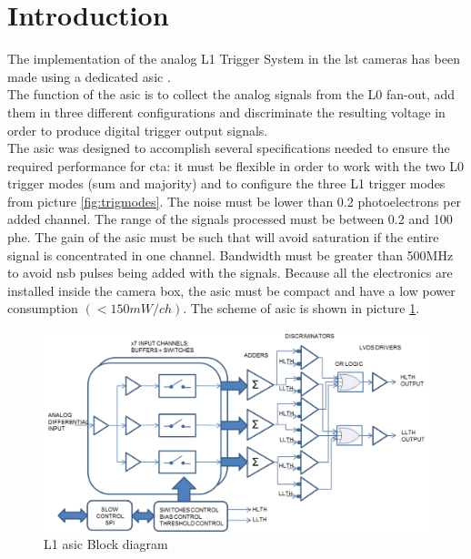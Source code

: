 \documentclass[main.tex]{subfiles}
\begin{document}
\glsresetall

\section{Introduction}

The implementation of the analog L1 Trigger System in the \gls{lst} cameras has been made using a dedicated \gls{asic} \cite{2014ASIC}.\\
The function of the \gls{asic} is to collect the analog signals from the L0 fan-out, add them in three different configurations and discriminate the resulting voltage in order to produce digital trigger output signals.\\
The \gls{asic} was designed to accomplish several specifications needed to ensure the required performance for \gls{cta}: it must be flexible in order to work with the two L0 trigger modes (sum and majority) and to configure the three L1 trigger modes from picture \ref{fig:trigmodes}. The noise must be lower than 0.2 photoelectrons per added channel. The range of the signals processed must be between 0.2 and 100 phe. The gain of the \gls{asic} must be
such that will avoid saturation if the entire signal is concentrated in one channel. Bandwidth must be greater than 500MHz to avoid \gls{nsb} pulses being added with the signals. Because all the electronics are installed inside the camera box, the \gls{asic} must be compact and have a low power consumption $(< 150 mW/ch)$. The scheme of \gls{asic} is shown in picture \ref{fig:l1diagram}.

\begin{figure}[h]
  \centering
  \includegraphics[width=\textwidth]{./Pictures/L1blockdiagram.pdf}
  \caption{L1 \gls{asic} Block diagram}
  \label{fig:l1diagram}
\end{figure}
\end{document}
